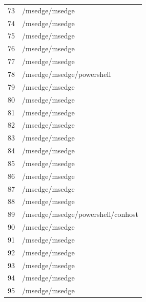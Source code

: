 \documentclass[a4paper,twoside,12pt]{book}
\begin{document}
\begin{appendices}
\begin{table}
\begin{tabular}{ll}
		73  &                                     /msedge/msedge \\
		74  &                                     /msedge/msedge \\
		75  &                                     /msedge/msedge \\
		76  &                                     /msedge/msedge \\
		77  &                                     /msedge/msedge \\
		78  &                          /msedge/msedge/powershell \\
		79  &                                     /msedge/msedge \\
		80  &                                     /msedge/msedge \\
		81  &                                     /msedge/msedge \\
		82  &                                     /msedge/msedge \\
		83  &                                     /msedge/msedge \\
		84  &                                     /msedge/msedge \\
		85  &                                     /msedge/msedge \\
		86  &                                     /msedge/msedge \\
		87  &                                     /msedge/msedge \\
		88  &                                     /msedge/msedge \\
		89  &                  /msedge/msedge/powershell/conhost \\
		90  &                                     /msedge/msedge \\
		91  &                                     /msedge/msedge \\
		92  &                                     /msedge/msedge \\
		93  &                                     /msedge/msedge \\
		94  &                                     /msedge/msedge \\
		95  &                                     /msedge/msedge \\
		\bottomrule
	\end{tabular}
\end{table}
\begin{table}
	\centering
	\begin{tabular}{ll}
		\toprule

\end{tabular}
\end{table}
\end{appendices}
\end{document}
